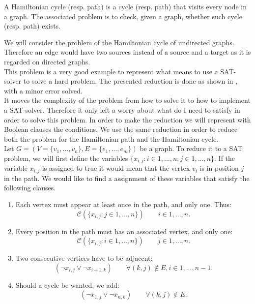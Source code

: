 \begin{definition}
  A Hamiltonian cycle (resp. path) is a cycle (resp. path) that visits every node in a graph. The associated problem is to check, given a graph, whether such cycle (resp. path) exists.
\end{definition}

We will consider the problem of the Hamiltonian cycle of undirected graphs. Therefore an edge would have two sources instead of a source and a target as it is regarded on directed graphs.\\

This problem is a very good example to represent what means to use a SAT-solver to solve a hard problem. The presented reduction is done as shown in \cite{49593}, with a minor error solved.\\


It moves the complexity of the problem from how to solve it to how to implement a SAT-solver. Therefore it only left a worry about what do I need to satisfy in order to solve this problem. In order to make the reduction we will represent with Boolean clauses the conditions. We use the same reduction in order to reduce both the problem for the Hamiltonian path and the Hamiltonian cycle.\\

Let $G=(V=\{ v_1,...,v_n\},E= \{e_1,...,e_m\})$ be a graph. To reduce it to a SAT problem, we will first define the variables $\{x_{i,j}: i\in 1,...,n ; j\in 1,...,n \}$. If the variable $x_{i,j}$ is assigned to true it would mean that the vertex $v_i$ is in position $j$ in the path. We would like to find a assignment of these variables that satisfy the following clauses.


\begin{enumerate}
\item Each vertex must appear at least once in the path, and only one. Thus:
  $$\mathcal{C}( \{x_{i,j} : j \in 1,...,n \}) \qquad i \in 1,...,n.$$

\item Every position in the path must has an associated vertex, and only one:
  $$\mathcal{C}( \{x_{i,j} : i \in 1,...,n \}) \qquad j \in 1,...,n.$$
\item Two consecutive vertices have to be adjacent:
  $$(\neg x_{i,j} \vee \neg x_{i+1,k})\qquad \forall (k,j) \not \in E, i \in 1,...,n-1.$$
\item Should a cycle be wanted, we add:
  $$(\neg x_{1,j} \vee \neg x_{n,k})\qquad \forall (k,j) \not \in E.$$
\end{enumerate}

